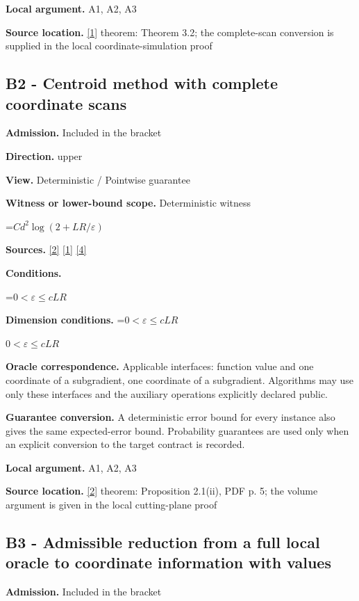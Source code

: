 \documentclass[10pt,a4paper]{article}
\newcommand{\AtlasMath}[1]{\par\begingroup\centering\setbox0=\hbox{$\displaystyle #1$}\ifdim\wd0>1.4\linewidth\typeout{ATLAS WIDE FORMULA: \the\wd0}\fi\ifdim\wd0>\linewidth\resizebox{\linewidth}{!}{\box0}\else\box0\fi\par\endgroup}
\newcommand{\AtlasInlineMath}[1]{\begingroup\setbox0=\hbox{$#1$}\ifdim\wd0>.4\linewidth\endgroup\AtlasMath{#1}\else\endgroup$#1$\fi}
\begin{document}
\textbf{Local argument.} A1, A2, A3

\textbf{Source location.} \href{https://arxiv.org/pdf/1405.4980}{[1]} theorem: Theorem 3.2; the complete-scan conversion is supplied in the local coordinate-simulation proof

\subsection{B2 - Centroid method with complete coordinate scans}
\textbf{Admission.} Included in the bracket

\textbf{Direction.} upper

\textbf{View.} Deterministic / Pointwise guarantee

\textbf{Witness or lower-bound scope.} Deterministic witness

\AtlasMath{Cd^2\log(2+LR/\varepsilon)}
\textbf{Sources.} \href{https://www2.isye.gatech.edu/~nemirovs/MOR_AccuracyCertificates.pdf}{[2]} \href{https://arxiv.org/pdf/1405.4980}{[1]} \href{https://arxiv.org/pdf/2609.20701}{[4]}

\textbf{Conditions.} 
\AtlasMath{0<\varepsilon\le cLR}


\textbf{Dimension conditions.} \AtlasInlineMath{0<\varepsilon\le cLR}

\textbf{Oracle correspondence.} Applicable interfaces: function value and one coordinate of a subgradient, one coordinate of a subgradient. Algorithms may use only these interfaces and the auxiliary operations explicitly declared public.

\textbf{Guarantee conversion.} A deterministic error bound for every instance also gives the same expected-error bound. Probability guarantees are used only when an explicit conversion to the target contract is recorded.

\textbf{Local argument.} A1, A2, A3

\textbf{Source location.} \href{https://www2.isye.gatech.edu/~nemirovs/MOR_AccuracyCertificates.pdf}{[2]} theorem: Proposition 2.1(ii), PDF p. 5; the volume argument is given in the local cutting-plane proof

\subsection{B3 - Admissible reduction from a full local oracle to coordinate information with values}
\textbf{Admission.} Included in the bracket
\end{document}
